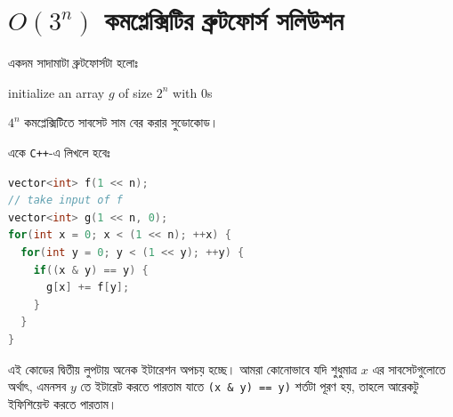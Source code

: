 \section{\texorpdfstring{$O(3^n)$}{O(pow(3,n))} কমপ্লেক্সিটির ব্রুটফোর্স
সলিউশন}
একদম সাদামাটা ব্রুটফোর্সটা হলোঃ

\begin{algorithm}[H]
  initialize an array $g$ of size $2^n$ with 0s\;
   {
     {
    }
  }
  \caption{$4^n$ কমপ্লেক্সিটিতে সাবসেট সাম বের করার সুডোকোড।}
\end{algorithm}

একে \texttt{C++}-এ লিখলে হবেঃ
\begin{lstlisting}[language=C++]
vector<int> f(1 << n);
// take input of f
vector<int> g(1 << n, 0);
for(int x = 0; x < (1 << n); ++x) {
  for(int y = 0; y < (1 << y); ++y) {
    if((x & y) == y) {
      g[x] += f[y];
    }
  }
}
\end{lstlisting}
এই কোডের দ্বিতীয় লুপটায় অনেক ইটারেশন অপচয় হচ্ছে। আমরা কোনোভাবে যদি শুধুমাত্র
$x$ এর সাবসেটগুলোতে অর্থাৎ, এমনসব $y$ তে ইটারেট করতে পারতাম যাতে \texttt{(x
\& y) == y)} শর্তটা পূরণ হয়, তাহলে আরেকটু ইফিশিয়েন্ট করতে পারতাম।

